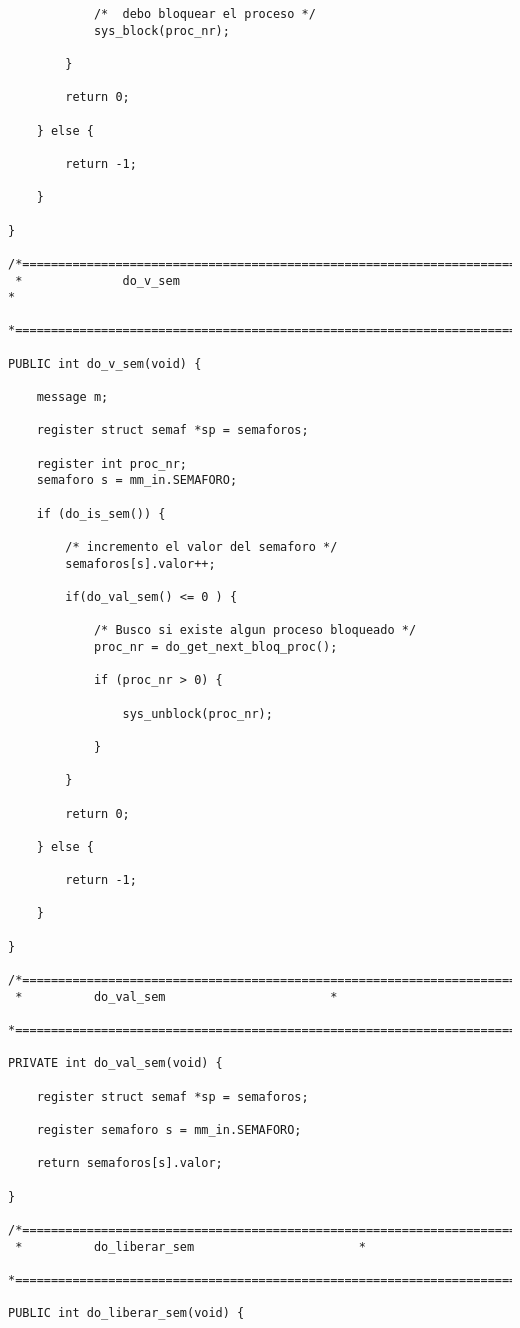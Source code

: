 \begin{verbatim}
			/*  debo bloquear el proceso */
			sys_block(proc_nr);

		}

		return 0;

	} else {

		return -1;

	}

}

/*===========================================================================*
 *				do_v_sem					     							 *
 *===========================================================================*/

PUBLIC int do_v_sem(void) {

	message m;

	register struct semaf *sp = semaforos;

	register int proc_nr;
	semaforo s = mm_in.SEMAFORO;

	if (do_is_sem()) {

		/* incremento el valor del semaforo */
		semaforos[s].valor++;

		if(do_val_sem() <= 0 ) {

			/* Busco si existe algun proceso bloqueado */
			proc_nr = do_get_next_bloq_proc();

			if (proc_nr > 0) {

				sys_unblock(proc_nr);

			}

		}

		return 0;

	} else {

		return -1;

	}

}

/*===========================================================================*
 *			do_val_sem					     *
 *===========================================================================*/

PRIVATE int do_val_sem(void) {

	register struct semaf *sp = semaforos;

	register semaforo s = mm_in.SEMAFORO;

	return semaforos[s].valor;

}

/*===========================================================================*
 *			do_liberar_sem   				     *
 *===========================================================================*/

PUBLIC int do_liberar_sem(void) {


\end{verbatim}
